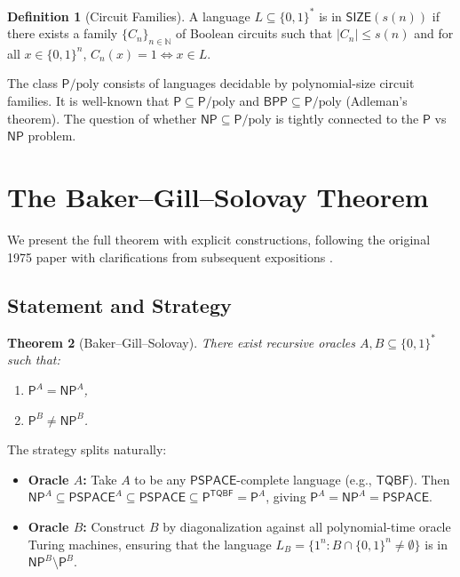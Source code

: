 \documentclass[11pt,a4paper]{article}
\theoremstyle{plain}
\newtheorem{theorem}{Theorem}[section]
\theoremstyle{definition}
\newtheorem{definition}[theorem]{Definition}
\theoremstyle{remark}
\newcommand{\N}{\mathbb{N}}
\newcommand{\PP}{\mathsf{P}}
\newcommand{\NP}{\mathsf{NP}}
\newcommand{\PSPACE}{\mathsf{PSPACE}}
\newcommand{\BPP}{\mathsf{BPP}}
\newcommand{\poly}{\mathrm{poly}}
\newcommand{\TQBF}{\mathsf{TQBF}}
\newcommand{\bits}{\{0,1\}}
\newcommand{\bitsstar}{\{0,1\}^*}
\newcommand{\class}[1]{\mathsf{#1}}
\begin{document}
\begin{definition}[Circuit Families]
A language $L \subseteq \bitsstar$ is in $\class{SIZE}(s(n))$ if there exists a
family $\{C_n\}_{n \in \N}$ of Boolean circuits such that $|C_n| \leq s(n)$ and
for all $x \in \bits^n$, $C_n(x) = 1 \iff x \in L$.
\end{definition}

The class $\PP/\poly$ consists of languages decidable by polynomial-size circuit
families.  It is well-known that $\PP \subseteq \PP/\poly$ and
$\BPP \subseteq \PP/\poly$ (Adleman's theorem).  The question of whether
$\NP \subseteq \PP/\poly$ is tightly connected to the $\PP$ vs $\NP$ problem.

\section{The Baker--Gill--Solovay Theorem}\label{sec:bgs}

We present the full theorem with explicit constructions, following the original
1975 paper \cite{BGS75} with clarifications from subsequent expositions
\cite{AroraBarak09,HO02}.

\subsection{Statement and Strategy}

\begin{theorem}[Baker--Gill--Solovay]\label{thm:bgs}
There exist recursive oracles $A, B \subseteq \bitsstar$ such that:
\begin{enumerate}[label=(\roman*)]
    \item $\PP^A = \NP^A$,
    \item $\PP^B \neq \NP^B$.
\end{enumerate}
\end{theorem}

The strategy splits naturally:

\begin{itemize}
    \item \textbf{Oracle $A$:} Take $A$ to be any $\PSPACE$-complete language
    (e.g., $\TQBF$).  Then $\NP^A \subseteq \PSPACE^A \subseteq \PSPACE
    \subseteq \PP^{\TQBF} = \PP^A$, giving $\PP^A = \NP^A = \PSPACE$.

    \item \textbf{Oracle $B$:} Construct $B$ by diagonalization against all
    polynomial-time oracle Turing machines, ensuring that the language
    $L_B = \{1^n : B \cap \bits^n \neq \emptyset\}$ is in $\NP^B \setminus \PP^B$.
\end{itemize}
\end{document}
